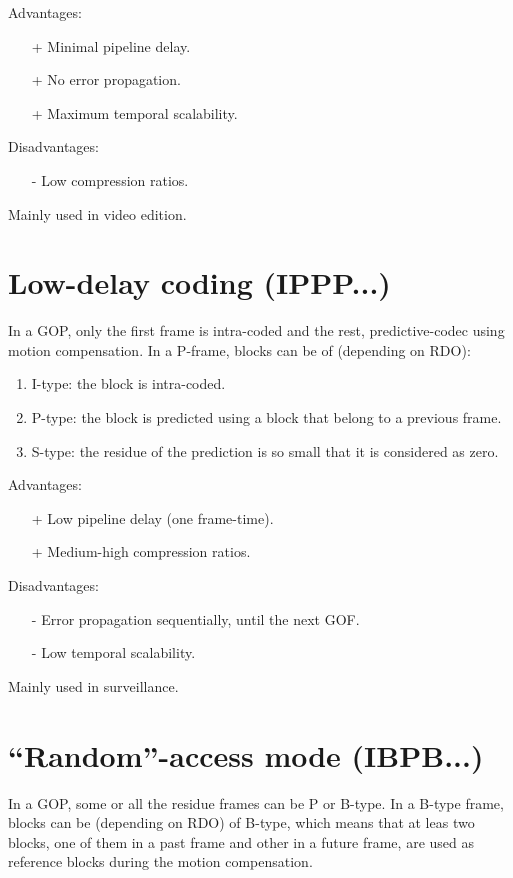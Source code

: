 Advantages:
\begin{itemize}
\item [+] Minimal pipeline delay.
\item [+] No error propagation.
\item [+] Maximum temporal scalability.
\end{itemize}

Disadvantages:
\begin{enumerate}
\item [-] Low compression ratios.
\end{enumerate}

Mainly used in video edition.

\section{Low-delay coding (IPPP...)}

In a GOP, only the first frame is intra-coded and the rest,
predictive-codec using motion compensation. In a P-frame, blocks can
be of (depending on RDO):
\begin{enumerate}
\item I-type: the block is intra-coded.
\item P-type: the block is predicted using a block that belong to a previous frame.
\item S-type: the residue of the prediction is so small that it is considered as zero.
\end{enumerate}

Advantages:
\begin{itemize}
\item [+] Low pipeline delay (one frame-time).
\item [+] Medium-high compression ratios.
\end{itemize}

Disadvantages:
\begin{enumerate}
\item [-] Error propagation sequentially, until the next GOF.
\item [-] Low temporal scalability.
\end{enumerate}

Mainly used in surveillance.

\section{``Random''-access mode (IBPB...)}

In a GOP, some or all the residue frames can be P or B-type. In a
B-type frame, blocks can be (depending on RDO) of B-type, which means
that at leas two blocks, one of them in a past frame and other in a
future frame, are used as reference blocks during the motion
compensation.

